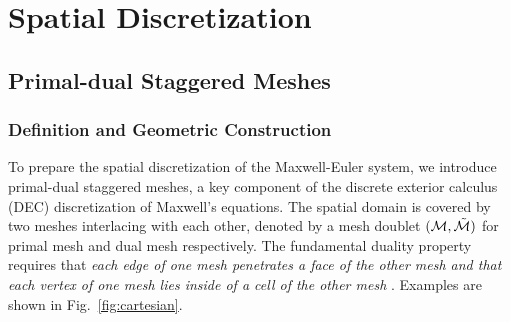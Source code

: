 \documentclass{article}
\begin{document}

\section{Spatial Discretization} \label{sec:spatial_discretization}
\subsection{Primal-dual Staggered Meshes} \label{sec:mesh-duality}
\subsubsection{Definition and Geometric Construction}

To prepare the spatial discretization of the Maxwell-Euler system, we introduce
primal-dual staggered meshes, a key component of the discrete exterior calculus (DEC)
discretization of Maxwell's equations. The spatial domain is covered by two meshes
interlacing with each other, denoted by a mesh doublet
$(\mathcal{M}, \Tilde{\mathcal{M}})$ for primal mesh and dual mesh respectively. The
fundamental duality property requires that \emph{each edge of one mesh penetrates a face
  of the other mesh and that each vertex of one mesh lies inside of a cell of the other
  mesh} \cite[][Sec. 2]{weiland_2003}. Examples are shown in Fig.~\ref{fig:cartesian}.
\end{document}

